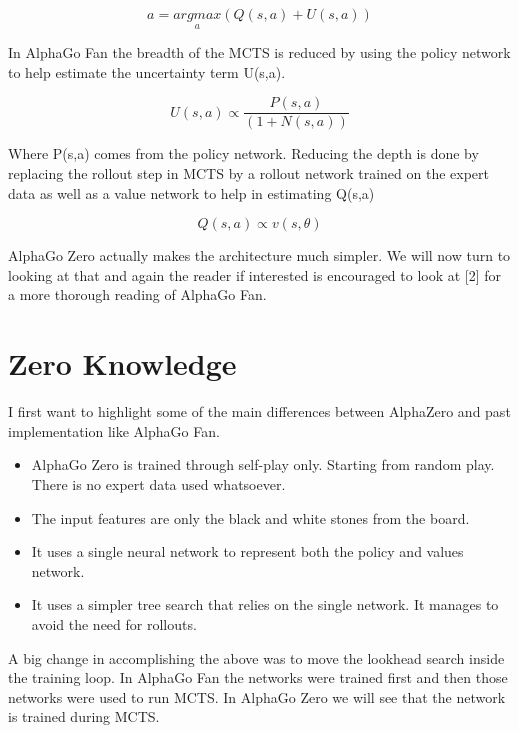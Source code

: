     \begin{equation}
      a = \underset{a}{argmax}(Q(s,a) + U(s,a))
    \end{equation}
    
    In AlphaGo Fan the breadth of the MCTS is reduced by using the policy network to help estimate the uncertainty term U(s,a). 
    
    \begin{equation}
        U(s,a) \propto \frac{P(s,a)}{(1 + N(s,a))}
    \end{equation}
    
    Where P(s,a) comes from the policy network. Reducing the depth is done by replacing the rollout step in MCTS by a rollout network trained on the expert data as well as a value network to help in estimating Q(s,a)
    
    \begin{equation}
        Q(s,a) \propto v(s,\theta)
    \end{equation}
    
    AlphaGo Zero actually makes the architecture much simpler. We will now turn to looking at that and again the reader if interested is encouraged to look at [2] for a more thorough reading of AlphaGo Fan. 
    
    \section{Zero Knowledge}
    
    I first want to highlight some of the main differences between AlphaZero and past implementation like AlphaGo Fan. 
    \begin{itemize}
         \item AlphaGo Zero is trained through self-play only. Starting from random play. There is no expert data used whatsoever. 
         
         \item The input features are only the black and white stones from the board. 
         
         \item It uses a single neural network to represent both the policy and values network. 
         \item It uses a simpler tree search that relies on the single network. It manages to avoid the need for rollouts. 
     
    \end{itemize}

      A big change in accomplishing the above was to move the lookhead search inside the training loop. In AlphaGo Fan the networks were trained first and then those networks were used to run MCTS. In AlphaGo Zero we will see that the network is trained during MCTS. 
    

